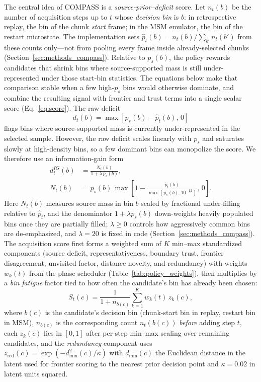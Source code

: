 \documentclass[journal=jctcce,manuscript=article,layout=twocolumn]{achemso}
\begin{document}
The central idea of COMPASS is a \emph{source-prior--deficit} score. Let $n_t(b)$ be the number of acquisition steps up to $t$ whose \emph{decision bin} is $b$: in retrospective replay, the bin of the chunk \emph{start} frame; in the MSM emulator, the bin of the restart microstate. The implementation sets $\hat{p}_t(b)=n_t(b)/\sum_{b'} n_t(b')$ from these counts only---not from pooling every frame inside already-selected chunks (Section~\ref{sec:methods_compass}). Relative to $p_s(b)$, the policy rewards candidates that shrink bins where source-supported mass is still under-represented under those start-bin statistics. The equations below make that comparison stable when a few high-$p_s$ bins would otherwise dominate, and combine the resulting signal with frontier and trust terms into a single scalar score (Eq.~\ref{eq:score}). The raw deficit
\begin{equation}
    d_t(b) = \max\!\left[p_s(b) - \hat{p}_t(b),\,0\right]
    \label{eq:raw_deficit}
\end{equation}
flags bins where source-supported mass is currently under-represented in the selected sample. However, the raw deficit scales linearly with $p_s$ and saturates slowly at high-density bins, so a few dominant bins can monopolize the score. We therefore use an information-gain form
\begin{equation}
\begin{split}
    d^{IG}_t(b) &= \frac{N_t(b)}{1+\lambda\,p_s(b)},\\
    N_t(b) &= p_s(b)\,\max\!\left[1-\frac{\hat{p}_t(b)}{\max(p_s(b),10^{-12})},\,0\right].
\end{split}
    \label{eq:ig_deficit}
\end{equation}
Here $N_t(b)$ measures source mass in bin $b$ scaled by fractional under-filling relative to $\hat{p}_t$, and the denominator $1+\lambda p_s(b)$ down-weights heavily populated bins once they are partially filled; $\lambda\geq 0$ controls how aggressively common bins are de-emphasized, and $\lambda=20$ is fixed in code (Section~\ref{sec:methods_compass}). The acquisition score first forms a weighted sum of $K$ min--max standardized components (source deficit, representativeness, boundary trust, frontier disagreement, unvisited factor, distance novelty, and redundancy) with weights $w_k(t)$ from the phase scheduler (Table~\ref{tab:policy_weights}), then multiplies by a \emph{bin fatigue} factor tied to how often the candidate's bin has already been chosen:
\begin{equation}
    S_t(c) = \frac{1}{1+n_{b(c)}}\sum_{k=1}^{K} w_k(t)\,z_k(c),
    \label{eq:score}
\end{equation}
where $b(c)$ is the candidate's decision bin (chunk-start bin in replay, restart bin in MSM), $n_{b(c)}$ is the corresponding count $n_t(b(c))$ \emph{before} adding step $t$, each $z_k(c)$ lies in $[0,1]$ after per-step min--max scaling over remaining candidates, and the \emph{redundancy} component uses $z_{\mathrm{red}}(c)=\exp(-d_{\min}^2(c)/\kappa)$ with $d_{\min}(c)$ the Euclidean distance in the latent used for frontier scoring to the nearest prior decision point and $\kappa=0.02$ in latent units squared.
\end{document}
